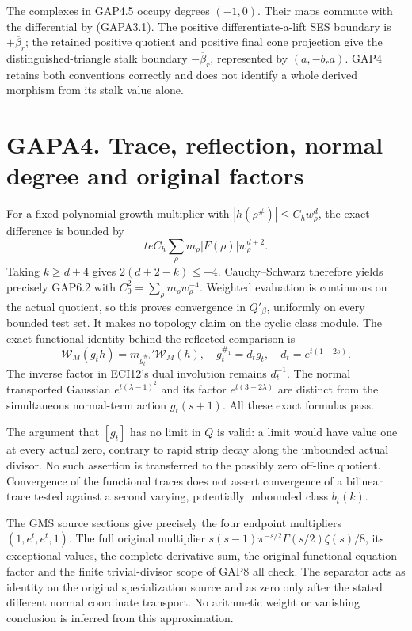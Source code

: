 The complexes in GAP4.5 occupy degrees \((-1,0)\). Their maps commute
with the differential by (GAPA3.1). The positive differentiate-a-lift
SES boundary is \(+\overline\beta_r\); the retained positive quotient
and positive final cone projection give the distinguished-triangle stalk
boundary \(-\overline\beta_r\), represented by \((a,-b_ra)\). GAP4
retains both conventions correctly and does not identify a whole derived
morphism from its stalk value alone.

\section{GAPA4. Trace, reflection, normal degree and original
factors}\label{gapa4.-trace-reflection-normal-degree-and-original-factors}

For a fixed polynomial-growth multiplier with
\(|h(\rho^\#)|\le C_hw_\rho^d\), the exact difference is bounded by \[
teC_h\sum_\rho m_\rho|F(\rho)|w_\rho^{d+2}.
\] Taking \(k\ge d+4\) gives \(2(d+2-k)\le-4\). Cauchy--Schwarz
therefore yields precisely GAP6.2 with
\(C_0^2=\sum_\rho m_\rho w_\rho^{-4}\). Weighted evaluation is
continuous on the actual quotient, so this proves convergence in
\(Q'_\beta\), uniformly on every bounded test set. It makes no topology
claim on the cyclic class module. The exact functional identity behind
the reflected comparison is \[
\mathcal W_M(g_th)=m_{g_t^{\#_1}}'\mathcal W_M(h),
\quad g_t^{\#_1}=d_tg_t,
\quad d_t=e^{t(1-2s)}.
\tag{GAPA4.1}
\] The inverse factor in ECI12's dual involution remains \(d_t^{-1}\).
The normal transported Gaussian \(e^{t(\lambda-1)^2}\) and its factor
\(e^{t(3-2\lambda)}\) are distinct from the simultaneous normal-term
action \(g_t(s+1)\). All these exact formulas pass.

The argument that \([g_t]\) has no limit in \(Q\) is valid: a limit
would have value one at every actual zero, contrary to rapid strip decay
along the unbounded actual divisor. No such assertion is transferred to
the possibly zero off-line quotient. Convergence of the functional
traces does not assert convergence of a bilinear trace tested against a
second varying, potentially unbounded class \(b_t(k)\).

The GMS source sections give precisely the four endpoint multipliers
\((1,e^t,e^t,1)\). The full original multiplier
\(s(s-1)\pi^{-s/2}\Gamma(s/2)\zeta(s)/8\), its exceptional values, the
complete derivative sum, the original functional-equation factor and the
finite trivial-divisor scope of GAP8 all check. The separator acts as
identity on the original specialization source and as zero only after
the stated different normal coordinate transport. No arithmetic weight
or vanishing conclusion is inferred from this approximation.

